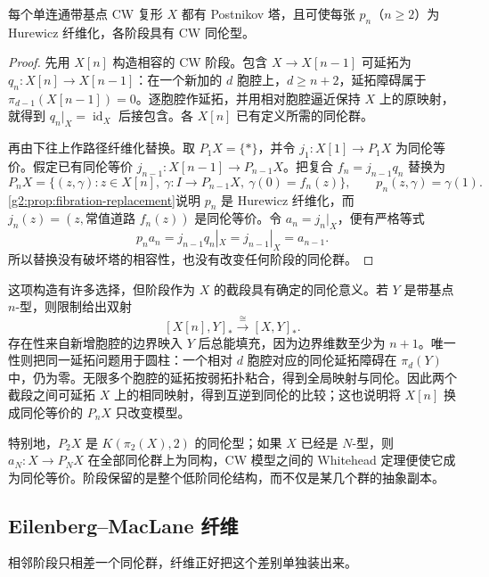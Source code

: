 \begin{theorem}\label{g2:thm:postnikov-tower-existence}
	每个单连通带基点 CW 复形 \(X\) 都有 Postnikov 塔，且可使每张 \(p_n\)（\(n\ge2\)）为 Hurewicz 纤维化，各阶段具有 CW 同伦型。
\end{theorem}
\begin{proof}
	先用 \(X[n]\) 构造相容的 CW 阶段。包含 \(X\to X[n-1]\) 可延拓为 \(q_n:X[n]\to X[n-1]\)：在一个新加的 \(d\) 胞腔上，\(d\ge n+2\)，延拓障碍属于 \(\pi_{d-1}(X[n-1])=0\)。逐胞腔作延拓，并用相对胞腔逼近保持 \(X\) 上的原映射，就得到 \(q_n|_X=\operatorname{id}_X\) 后接包含。各 \(X[n]\) 已有定义所需的同伦群。

	再由下往上作路径纤维化替换。取 \(P_1X=\{*\}\)，并令 \(j_1:X[1]\to P_1X\) 为同伦等价。假定已有同伦等价 \(j_{n-1}:X[n-1]\to P_{n-1}X\)。把复合 \(f_n=j_{n-1}q_n\) 替换为
	\[
		P_nX=\{(z,\gamma):z\in X[n],\ \gamma:I\to P_{n-1}X,\ \gamma(0)=f_n(z)\},
		\qquad p_n(z,\gamma)=\gamma(1).
	\]
	\cref{g2:prop:fibration-replacement}说明 \(p_n\) 是 Hurewicz 纤维化，而 \(j_n(z)=(z,\text{常值道路 }f_n(z))\) 是同伦等价。令 \(a_n=j_n|_X\)，便有严格等式
	\[
		p_na_n=j_{n-1}q_n|_X=j_{n-1}|_X=a_{n-1}.
	\]
	所以替换没有破坏塔的相容性，也没有改变任何阶段的同伦群。
\end{proof}

这项构造有许多选择，但阶段作为 \(X\) 的截段具有确定的同伦意义。若 \(Y\) 是带基点 \(n\)-型，则限制给出双射
\begin{equation}\label{g2:eq:postnikov-truncation-universal}
	[X[n],Y]_*\xrightarrow{\cong}[X,Y]_*.
\end{equation}
存在性来自新增胞腔的边界映入 \(Y\) 后总能填充，因为边界维数至少为 \(n+1\)。唯一性则把同一延拓问题用于圆柱：一个相对 \(d\) 胞腔对应的同伦延拓障碍在 \(\pi_d(Y)\) 中，仍为零。无限多个胞腔的延拓按弱拓扑粘合，得到全局映射与同伦。因此两个截段之间可延拓 \(X\) 上的相同映射，得到互逆到同伦的比较；这也说明将 \(X[n]\) 换成同伦等价的 \(P_nX\) 只改变模型。

\ProseParagraphBreak

特别地，\(P_2X\) 是 \(K(\pi_2(X),2)\) 的同伦型；如果 \(X\) 已经是 \(N\)-型，则 \(a_N:X\to P_NX\) 在全部同伦群上为同构，CW 模型之间的 Whitehead 定理便使它成为同伦等价。阶段保留的是整个低阶同伦结构，而不仅是某几个群的抽象副本。

\subsection{Eilenberg–MacLane 纤维}
\label{g2:subsec:1203:02}

相邻阶段只相差一个同伦群，纤维正好把这个差别单独装出来。

